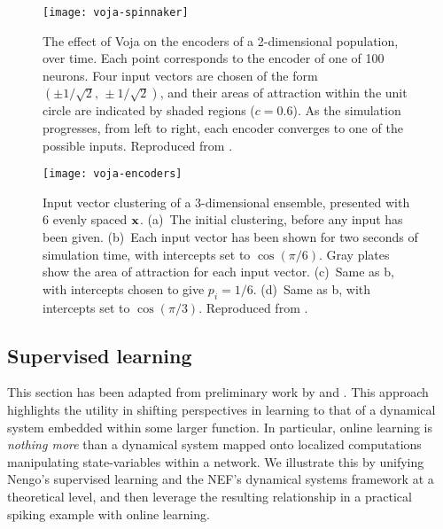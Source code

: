 \begin{figure}
    \centering
  \texttt{[image: voja-spinnaker]}
  \caption[Unsupervised learning of a two-dimensional representation.]{
The effect of Voja on the encoders of a 2-dimensional population, over time.
Each point corresponds to the encoder of one of \num{100} neurons.
Four input vectors are chosen of the form $(\pm 1 / \sqrt{2}, \, \pm 1 / \sqrt{2})$, and their areas of attraction within the unit circle are indicated by shaded regions ($c = 0.6$).
As the simulation progresses, from left to right, each encoder converges to one of the possible inputs.
Reproduced from \citet{knight2016}.
  \label{fig:voja-spinnaker}
    }

  \vspace{1em}

    \texttt{[image: voja-encoders]}
    \caption[Unsupervised learning of a three-dimensional population.]{Input vector clustering of a 3-dimensional ensemble, presented with 6 evenly spaced $\mathbf{x}$. (a)~The initial clustering, before any input has been given. (b)~Each input vector has been shown for two seconds of simulation time, with intercepts set to $\cos \left(\pi / 6 \right)$. Gray plates show the area of attraction for each input vector. (c)~Same as b, with intercepts chosen to give $p_i = 1/6$. (d)~Same as b, with intercepts set to $\cos \left( \pi / 3 \right)$. \label{e3d}
    Reproduced from \citet{voelker2014a}.
       \label{fig:voja-encoders}
    }
\end{figure}

\subsection{Supervised learning}
\label{sec:supervised}

This section has been adapted from preliminary work by \citet{voelker2015} and \citet{voelker2017c}.
This approach highlights the utility in shifting perspectives in learning to that of a dynamical system embedded within some larger function.
In particular, online learning is \emph{nothing more} than a dynamical system mapped onto localized computations manipulating state-variables within a network.
We illustrate this by unifying Nengo's supervised learning and the NEF's dynamical systems framework at a theoretical level, and then leverage the resulting relationship in a practical spiking example with online learning.

